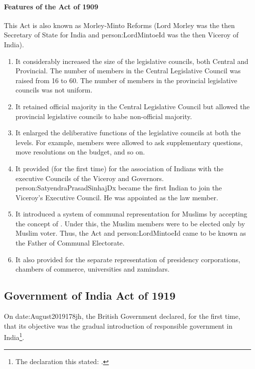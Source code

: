 \paragraph{Features of the Act of 1909}
This Act is also known as Morley-Minto Reforms (Lord Morley was the then Secretary of State for India and \gls{person:LordMintoeId} was the then Viceroy of India).
\begin{enumerate}
  \item It considerably increased the size of the legislative councils, both Central and Provincial. The number of members in the Central Legislative Council was raised from 16 to 60. The number of members in the provincial legislative councils was not uniform.
  \item It retained official majority in the Central Legislative Council but allowed the provincial legislative councils to habe non-official majority.
  \item It enlarged the deliberative functions of the legislative councils at both the levels. For example, members were allowed to ask supplementary questions, move resolutions on the budget, and so on.
  \item It provided (for the first time) for the association of Indians with the executive Councils of the Viceroy and Governors. \gls{person:SatyendraPrasadSinhajDx} became the first Indian to join the Viceroy's Executive Council. He was appointed as the law member.
  \item It introduced a system of communal representation for Muslims by accepting the concept of . Under this, the Muslim members were to be elected only by Muslim voter. Thus, the Act  and \gls{person:LordMintoeId} came to be known as the Father of Communal Electorate.
  \item It also provided for the separate representation of presidency corporations, chambers of commerce, universities and zamindars.
\end{enumerate}

\subsection{Government of India Act of 1919}

On \gls{date:August2019178jh}, the British Government declared, for the first time, that its objective was the gradual introduction of responsible government in India\footnote{The declaration this stated: .}.

